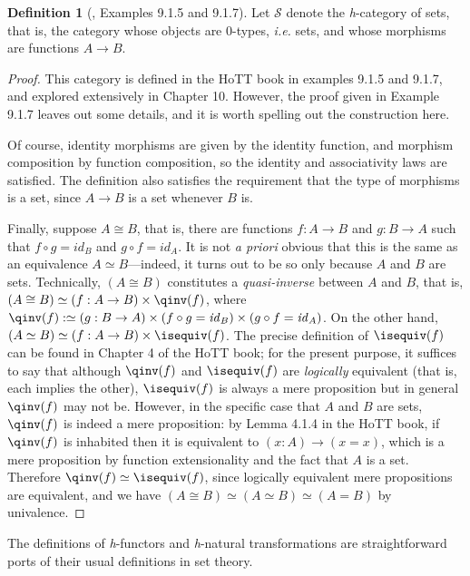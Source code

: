 \documentclass[preprint,authoryear]{sigplanconf}
\newcommand{\ie}{\latin{i.e.}\xspace}
\newcommand{\term}[1]{\emph{#1}}
\newcommand{\latin}[1]{\textit{#1}}
\newcommand{\mcal}[1]{\ensuremath{\mathcal{#1}}}
\newcommand{\comp}{\mathbin{\circ}}
\let\oldequiv\equiv
\newcommand{\jeq}{\oldequiv}          %
\newcommand{\defeq}{\mathrel{:\jeq}}  %
\renewcommand{\equiv}{\simeq}         %
\newcommand{\iso}{\cong}              %
\theoremstyle{definition}
\newtheorem{defn}[thm]{Definition}
\theoremstyle{remark}
\newcommand{\hott}[1]{\textit{h}-#1}
\newcommand{\ST}{\mcal{S}}
\newcommand{\id}{\ensuremath{\mathit{id}}}
\providecommand{\comp}{\circ}
\begin{document}
\begin{defn}[\citep{hottbook}, Examples 9.1.5 and 9.1.7]
  Let $\ST$ denote the \hott{category} of sets, that is, the category
  whose objects are $0$-types, \ie sets, and whose morphisms are
  functions $A \to B$.
\end{defn}
\begin{proof}
  This category is defined in the HoTT book in examples 9.1.5 and
  9.1.7, and explored extensively in Chapter 10.  However, the proof
  given in Example 9.1.7 leaves out some details, and it is worth
  spelling out the construction here.

  Of course, identity morphisms are given by the identity function,
  and morphism composition by function composition, so the identity
  and associativity laws are satisfied. The definition also satisfies
  the requirement that the type of morphisms is a set, since $A \to B$
  is a set whenever $B$ is.

  Finally, suppose $A \iso B$, that is, there are functions $f : A \to
  B$ and $g : B \to A$ such that $f \comp g = \id_B$ and $g \comp f =
  \id_A$.  It is not \latin{a priori} obvious that this is the same as
  an equivalence $A \equiv B$---indeed, it turns out to be so only
  because $A$ and $B$ are sets.  Technically, $(A \iso B)$ constitutes
  a \term{quasi-inverse} between $A$ and $B$, that is, $(A \iso B)
  \equiv (f : A \to B) \times \qinv(f)$, where $\qinv(f) \defeq (g : B
  \to A) \times (f \comp g = \id_B) \times (g \comp f = \id_A)$. On
  the other hand, $(A \equiv B) \equiv (f : A \to B) \times
  \isequiv(f)$.  The precise definition of $\isequiv(f)$ can be found
  in Chapter 4 of the HoTT book; for the present purpose, it suffices
  to say that although $\qinv(f)$ and $\isequiv(f)$ are
  \emph{logically} equivalent (that is, each implies the other),
  $\isequiv(f)$ is always a mere proposition but in general $\qinv(f)$
  may not be.  However, in the specific case that $A$ and $B$ are
  sets, $\qinv(f)$ is indeed a mere proposition: by Lemma 4.1.4 in the
  HoTT book, if $\qinv(f)$ is inhabited then it is equivalent to
  $(x:A) \to (x = x)$, which is a mere proposition by function
  extensionality and the fact that $A$ is a set.  Therefore $\qinv(f)
  \equiv \isequiv(f)$, since logically equivalent mere propositions
  are equivalent, and we have $(A \iso B) \equiv (A \equiv B) \equiv
  (A = B)$ by univalence.
\end{proof}

The definitions of \hott{functors} and \hott{natural transformations}
are straightforward ports of their usual definitions in set theory.
\end{document}
